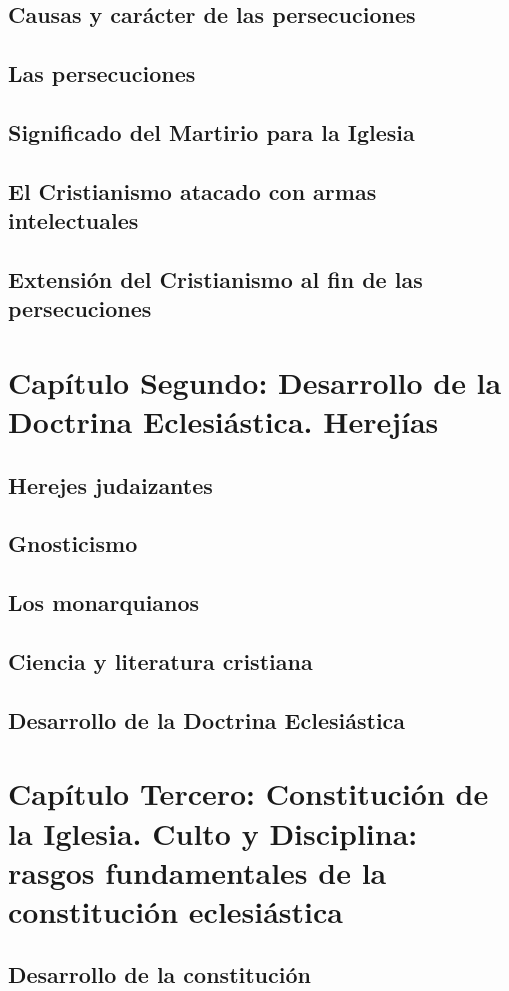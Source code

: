 \raggedbottom{} \documentclass[12pt, a4paper]{book}
\begin{document}
\section{Causas y carácter de las persecuciones}
\section{Las persecuciones}
\section{Significado del Martirio para la Iglesia}
\section{El Cristianismo atacado con armas intelectuales}
\section{Extensión del Cristianismo al fin de las persecuciones}
\chapter{Capítulo Segundo: Desarrollo de la Doctrina Eclesiástica. Herejías}
\section{Herejes judaizantes}
\section{Gnosticismo}
\section{Los monarquianos}
\section{Ciencia y literatura cristiana}
\section{Desarrollo de la Doctrina Eclesiástica}
\chapter{Capítulo Tercero: Constitución de la Iglesia. Culto y Disciplina: rasgos fundamentales de la constitución eclesiástica}
\section{Desarrollo de la constitución}
\end{document}
